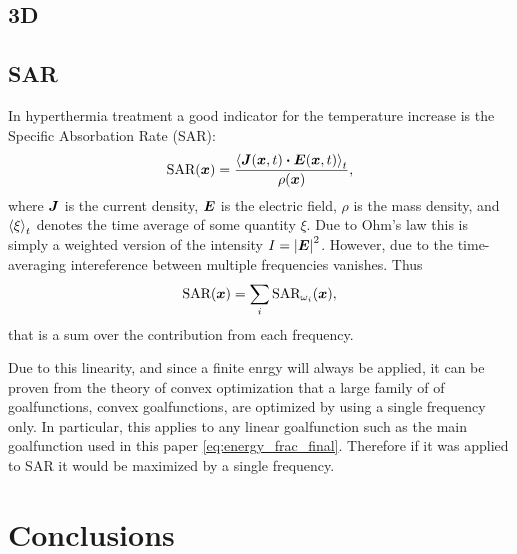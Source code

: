 \documentclass[11pt,a4paper, 
swedish,english %
]{article}
\begin{document}
\subsection{3D}

\subsection{SAR}
In hyperthermia treatment a good indicator for the temperature
increase is the Specific Absorbation Rate (SAR): 
\begin{equation*}
\text{SAR}(\vb*x)=
\frac{\ev{\vb*J(\vb*x,t)\vdot \vb*E(\vb*x,t)}_t}{\rho(\vb*x)},
\end{equation*}
where $\vb*J$ is the current density, $\vb*E$ is the
electric field, $\rho$ is the mass density, and $\ev{\xi}_t$ denotes
the time average of some quantity $\xi$.
Due to Ohm's law this is simply a weighted version of the intensity
$I=\abs{\vb*E}^2$.
However, due to the time-averaging intereference between multiple
frequencies vanishes. Thus
\begin{equation}
\text{SAR}(\vb*x)=\sum_i\text{SAR}_{\omega_i}(\vb*x),
\end{equation}
that is a sum over the contribution from each frequency.

Due to this linearity, and since a finite enrgy will always be applied, it can be proven from the theory of convex optimization 
that a large family of of goalfunctions, convex goalfunctions, are optimized by using a single frequency only. 
In particular, this applies to any linear goalfunction such as the main goalfunction used in this paper
\eqref{eq:energy_frac_final}. Therefore if it was applied to SAR it would be maximized by a single frequency.  

\label{sec:discussion}


\section{Conclusions}






\end{document}
